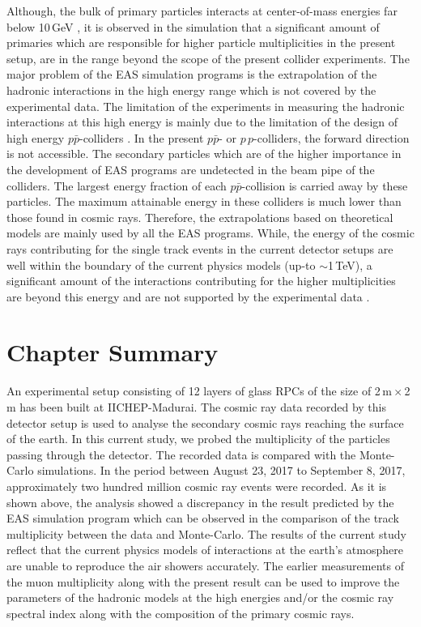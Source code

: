 Although, the bulk of primary particles interacts at center-of-mass
energies far below 10\,GeV \cite{corsika763}, it is observed in the
simulation that a significant amount of primaries which are
responsible for higher particle multiplicities in the present setup,
are in the range beyond the scope of the present collider experiments.
The major problem of the EAS simulation programs is the extrapolation
of the hadronic interactions in the high energy range which is not
covered by the experimental data. The limitation of the experiments
in measuring the hadronic interactions at this high energy is mainly
due to the limitation of the design of high energy $p\bar{p}$-colliders
\cite{corsika763}. In the present $p\bar{p}$- or $p\,p$-colliders, the
forward direction is not accessible. The secondary particles which are
of the higher importance in the development of EAS programs are
undetected in the beam pipe of the colliders. The largest energy
fraction of each $p\bar{p}$-collision is carried away by these
particles.
The maximum attainable energy in these colliders is much lower than
those found in cosmic rays. Therefore, the extrapolations based on
theoretical models are mainly used by all the EAS programs.
While, the energy of the cosmic rays contributing for the single track
events in the current detector setups are well within the boundary of
the current physics models (up-to $\sim$1\,TeV), a significant amount
of the interactions contributing for the higher multiplicities are
beyond this energy and are not supported by the experimental
data \cite{corsika763}.

\section{Chapter Summary}
An experimental setup consisting of 12 layers of glass RPCs of the size
of 2\,m\,$\times$\,2\,m has been built at IICHEP-Madurai. The cosmic
ray data recorded by this detector setup is used to analyse the
secondary cosmic rays reaching the surface of the earth. In this
current study, we probed the multiplicity of the particles passing
through the detector. The recorded data is compared with the
Monte-Carlo simulations.
In the period between August 23, 2017 to September 8, 2017,
approximately two hundred million cosmic ray events were recorded.
As it is shown above, the analysis showed a discrepancy in the
result predicted by the EAS simulation program which can be observed
in the comparison of the track multiplicity between the data and
Monte-Carlo. The results of the current study reflect that the current
physics models of interactions at the earth's atmosphere are unable to
reproduce the air showers accurately. The earlier measurements of the
muon multiplicity along with the present result can be used to
improve the parameters of the hadronic models at the high energies
and/or the cosmic ray spectral index along with the composition of the
primary cosmic rays.
